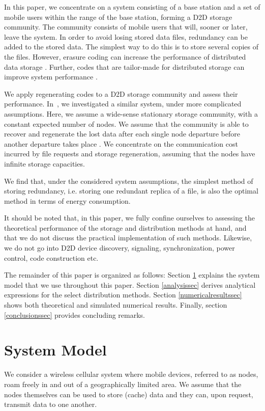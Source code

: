 \documentclass[10pt,conference]{IEEEtran}
\begin{document}
In this paper, we concentrate on a system consisting of a base station and a
set of mobile users within the range of the base station, forming a
D2D storage community. The community consists of mobile users that will, sooner or later, leave the system. In order
to avoid losing stored data files, redundancy can be added to the stored data. The simplest way to do this is to store several copies of the files.
However, erasure coding can increase the performance of distributed data
storage \cite{compa}. Further, codes that are tailor-made for
distributed storage can improve system performance \cite{tailor}.

We apply regenerating codes \cite{dima} to a D2D
storage community and assess their performance. In~\cite{paakk}, we
investigated a similar system, under more complicated assumptions.
Here, we assume a wide-sense stationary storage community, with a
constant expected number of nodes. We assume that the community is able to recover and regenerate the lost data after each
single node departure before another departure takes place . We concentrate on the communication cost
incurred by file requests and storage regeneration, assuming that
the nodes have infinite storage capacities.

We find that, under the considered system assumptions, the simplest method of storing redundancy, i.e. storing one redundant replica of a file, is also the optimal method in terms of energy consumption.

It should be noted that, in this paper, we fully confine ourselves to assessing the theoretical performance of the storage and distribution methods at hand, and that we do not discuss the practical implementation of such methods. Likewise, we do not go into D2D device discovery, signaling, synchronization, power control, code construction etc.

The remainder of this paper is organized as follows: Section
\ref{systemmodelsec} explains the system model that we use throughout
this paper. Section \ref{analysissec} derives analytical expressions
for the select distribution methods. Section \ref{numericalresultssec}
shows both theoretical and simulated numerical results. Finally,
section \ref{conclusionssec} provides concluding remarks.


\section{System Model}\label{systemmodelsec}

We consider a wireless cellular system where mobile devices, referred
to as nodes, roam freely in and out of a geographically limited area.
We assume that the nodes themselves can be used to store (cache) data
and they can, upon request, transmit data to one another.
\end{document}
